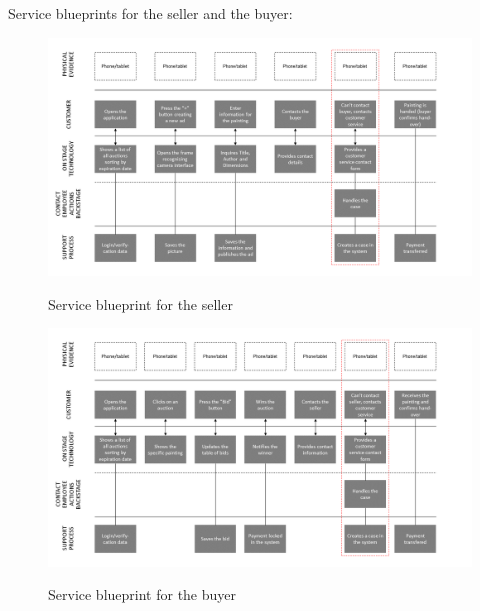 Service blueprints for the seller and the buyer:

\begin{figure}[H]
    \centering
\caption{Service blueprint for the seller}
\includegraphics[angle=270,origin=c,width=12cm]{Appendix/BlueprintSeller.PNG}
\label{ServiceBlueprintSeller}
\end{figure}

\begin{figure}[H]
    \centering
\caption{Service blueprint for the buyer}
\includegraphics[angle=270,origin=c,width=13cm]{Appendix/BlueprintBuyer.PNG}
\label{ServiceBlueprintBuyer}
\end{figure}